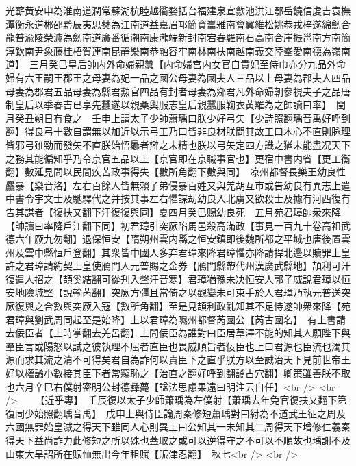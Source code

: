光蘄黄安申為淮南道潤常蘇湖杭睦越衢婺括台福建泉宣歙池洪江鄂岳饒信䖍吉袁橅潭衡永道郴邵黔辰夷思僰為江南道益嘉眉邛簡資巂雅南會翼維松姚恭戎梓遂綿劒合龍普渝陵榮瀘為劒南道廣番循潮南康瀧端新封南宕春羅南石高南合崖振邕南方南簡淳欽南尹象藤桂梧賀連南昆靜樂南恭融容牢南林南扶南越南義交陸峯愛南德為嶺南道】　三月癸巳皇后帥内外命婦親蠶【内命婦宫内女官自貴妃至侍巾亦分九品外命婦有六王嗣王郡王之母妻為妃一品之國公母妻為國夫人三品以上母妻為郡夫人四品母妻為郡君五品母妻為縣君勲官四品有封者母妻為鄉君凡外命婦朝參視夫子之品唐制皇后以季春吉已享先蠶遂以親桑輿服志皇后親蠶服鞠衣黄羅為之帥讀曰率】　閏月癸丑朔日有食之　壬申上謂太子少師蕭瑀曰朕少好弓矢【少詩照翻瑀音禹好呼到翻】得良弓十數自謂無以加近以示弓工乃曰皆非良材朕問其故工曰木心不直則脉理皆邪弓雖勁而發矢不直朕始悟曏者辯之未精也朕以弓矢定四方識之猶未能盡况天下之務其能徧知乎乃令京官五品以上【京官即在京職事官也】更宿中書内省【更工衡翻】數延見問以民間疾苦政事得失【數所角翻下數與同】　凉州都督長樂王幼良性麤暴【樂音洛】左右百餘人皆無賴子弟侵暴百姓又與羌胡互市或告幼良有異志上遣中書令宇文士及馳驛代之并按其事左右懼謀劫幼良入北虜又欲殺士及據有河西復有告其謀者【復扶又翻下汗復復與同】夏四月癸巳賜幼良死　五月苑君璋帥衆來降【帥讀曰率降戶江翻下同】初君璋引突厥陷馬邑殺高滿政【事見一百九十卷高祖武德六年厥九勿翻】退保恒安【隋朔州雲内縣之恒安鎮即後魏所都之平城也唐後置雲州及雲中縣恒戶登翻】其衆皆中國人多弃君璋來降君璋懼亦降請捍北邊以贖罪上皇許之君璋請約契上皇使鴈門人元普賜之金券【鴈門縣帶代州漢廣武縣地】頡利可汗復遣人招之【頡奚結翻可從刋入聲汗音寒】君璋猶豫未决恒安人郭子威說君璋以恒安地險城堅【說輸芮翻】突厥方彊且當倚之以觀變未可束手於人君璋乃執元普送突厥復與之合數與突厥入寇【數所角翻】至是見頡利政亂知其不足恃遂帥衆來降【苑君璋與劉武周同起至是始降】上以君璋為隰州都督芮國公【芮古國名】　有上書請去佞臣者【上時掌翻去羌呂翻】上問佞臣為誰對曰臣居草澤不能的知其人願陛下與羣臣言或陽怒以試之彼執理不屈者直臣也畏威順旨者佞臣也上曰君源也臣流也濁其源而求其流之清不可得矣君自為詐何以責臣下之直乎朕方以至誠治天下見前世帝王好以權譎小數接其臣下者常竊恥之【治直之翻好呼到翻譎古穴翻】卿策雖善朕不取也六月辛巳右僕射密明公封德彝薨【諡法思慮果遠曰明注云自任】<br />
<br />
　　【近乎專】　壬辰復以太子少師蕭瑀為左僕射【蕭瑀去年免官復扶又翻下第復同少始照翻瑀音禹】　戊申上與侍臣論周秦修短蕭瑀對曰紂為不道武王征之周及六國無罪始皇滅之得天下雖同人心則異上曰公知其一未知其二周得天下增修仁義秦得天下益尚詐力此修短之所以殊也蓋取之或可以逆得守之不可以不順故也瑀謝不及山東大旱詔所在賑恤無出今年租賦【賑津忍翻】　秋七<br />
<br />
